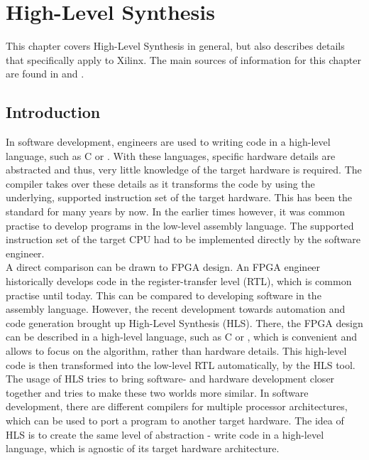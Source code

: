 \chapter{High-Level Synthesis}
\label{cha:HLS}

This chapter covers High-Level Synthesis in general, but also describes details that specifically apply to Xilinx.
The main sources of information for this chapter are found in \cite{VivadoUgHLSIntro}and \cite{VivadoUgHLS}.

\section{Introduction}

In software development, engineers are used to writing code in a high-level language, such as C or \cplusplus.
With these languages, specific hardware details are abstracted and thus, very little knowledge of the target hardware is required.
The compiler takes over these details as it transforms the code by using the underlying, supported instruction set of the target hardware.
This has been the standard for many years by now.
In the earlier times however, it was common practise to develop programs in the low-level assembly language.
The supported instruction set of the target CPU had to be implemented directly by the software engineer.\\

A direct comparison can be drawn to FPGA design.
An FPGA engineer historically develops code in the register-transfer level (RTL), which is common practise until today.
This can be compared to developing software in the assembly language.
However, the recent development towards automation and code generation brought up High-Level Synthesis (HLS).
There, the FPGA design can be described in a high-level language, such as C or \cplusplus, which is convenient and allows to focus on the algorithm, rather than hardware details.
This high-level code is then transformed into the low-level RTL automatically, by the HLS tool.\\

The usage of HLS tries to bring software- and hardware development closer together and tries to make these two worlds more similar.
In software development, there are different compilers for multiple processor architectures, which can be used to port a program to another target hardware.
The idea of HLS is to create the same level of abstraction - write code in a high-level language, which is agnostic of its target hardware architecture.\\

